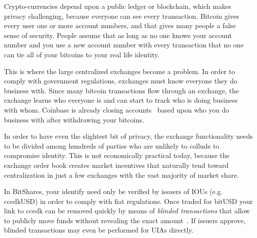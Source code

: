 Crypto-currencies depend upon a public ledger or blockchain, which makes
privacy challenging, because everyone can see every transaction. Bitcoin gives
every user one or more account numbers, and that gives many people a false
sense of security. People assume that as long as no one knows your account
number and you use a new account number with every transaction that no one can
tie all of your bitcoins to your real life identity.

This is where the large centralized exchanges become a problem. In order to
comply with government regulations, exchanges must know everyone they do
business with. Since many bitcoin transactions flow through an exchange, the
exchange learns who everyone is and can start to track who is doing business
with whom. Coinbase is already closing accounts~\cite{coinbase:privacy} based
upon who you do business with after withdrawing your bitcoins.

In order to have even the slightest bit of privacy, the exchange functionality
needs to be divided among hundreds of parties who are unlikely to collude to
compromise identity. This is not economically practical today, because the
exchange order book creates market incentives that naturally tend toward
centralization in just a few exchanges with the vast majority of market share.

In BitShares, your identify need only be verified by issuers of IOUs (e.g.
ccedkUSD) in order to comply with fiat regulations. Once traded for bitUSD your
link to ccedk can be removed quickly by means of \emph{blinded transactions}
that allow to publicly move funds without revealing the exact
amount~\cite{bts:general,blindSigPaper}. If issuers approve, blinded
transactions may even be performed for UIAs directly.
